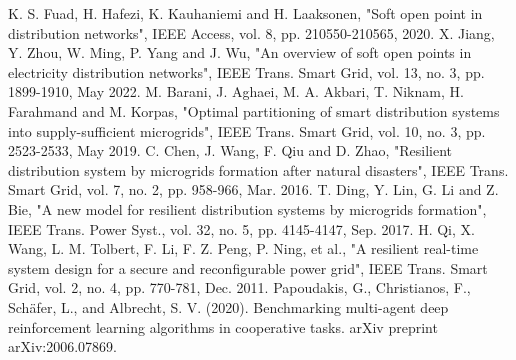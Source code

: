 \documentclass[conference]{IEEEtran}
\begin{document}
\begin{thebibliography}{00}
 K. S. Fuad, H. Hafezi, K. Kauhaniemi and H. Laaksonen, "Soft open point in distribution networks", IEEE Access, vol. 8, pp. 210550-210565, 2020.
  X. Jiang, Y. Zhou, W. Ming, P. Yang and J. Wu, "An overview of soft open points in electricity distribution networks", IEEE Trans. Smart Grid, vol. 13, no. 3, pp. 1899-1910, May 2022.
 M. Barani, J. Aghaei, M. A. Akbari, T. Niknam, H. Farahmand and M. Korpas, "Optimal partitioning of smart distribution systems into supply-sufficient microgrids", IEEE Trans. Smart Grid, vol. 10, no. 3, pp. 2523-2533, May 2019.
 C. Chen, J. Wang, F. Qiu and D. Zhao, "Resilient distribution system by microgrids formation after natural disasters", IEEE Trans. Smart Grid, vol. 7, no. 2, pp. 958-966, Mar. 2016.
 T. Ding, Y. Lin, G. Li and Z. Bie, "A new model for resilient distribution systems by microgrids formation", IEEE Trans. Power Syst., vol. 32, no. 5, pp. 4145-4147, Sep. 2017.
 H. Qi, X. Wang, L. M. Tolbert, F. Li, F. Z. Peng, P. Ning, et al., "A resilient real-time system design for a secure and reconfigurable power grid", IEEE Trans. Smart Grid, vol. 2, no. 4, pp. 770-781, Dec. 2011.
 Papoudakis, G., Christianos, F., Schäfer, L., and Albrecht, S. V. (2020). Benchmarking multi-agent deep reinforcement learning algorithms in cooperative tasks. arXiv preprint arXiv:2006.07869.


\end{thebibliography}
\end{document}
